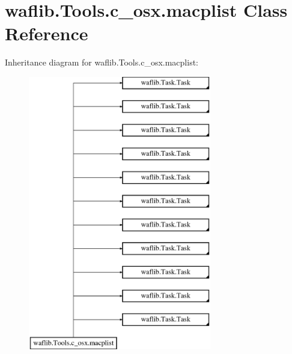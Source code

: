 \hypertarget{classwaflib_1_1_tools_1_1c__osx_1_1macplist}{}\section{waflib.\+Tools.\+c\+\_\+osx.\+macplist Class Reference}
\label{classwaflib_1_1_tools_1_1c__osx_1_1macplist}
Inheritance diagram for waflib.\+Tools.\+c\+\_\+osx.\+macplist\+:\begin{figure}[H]
\begin{center}
\leavevmode
\includegraphics[height=12.000000cm]{classwaflib_1_1_tools_1_1c__osx_1_1macplist}
\end{center}
\end{figure}

